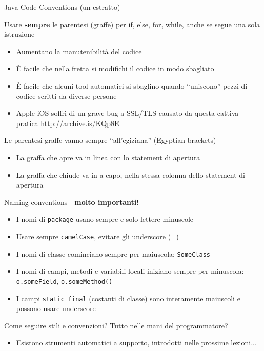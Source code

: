\documentclass[xcolor=dvipsnames,presentation]{beamer}
\begin{document}
\begin{frame}[allowframebreaks]{Java Code Conventions (un estratto)}
    \begin{block}{Usare \textbf{sempre} le parentesi (graffe) per if, else, for, while, anche se segue una sola istruzione}
        \begin{itemize}
            \item Aumentano la manutenibilità del codice
            \item È facile che nella fretta si modifichi il codice in modo sbagliato
            \item È facile che alcuni tool automatici si sbaglino quando ``uniscono'' pezzi di codice scritti da diverse persone
            \item Apple iOS soffrì di un grave bug a SSL/TLS causato da questa cattiva pratica \url{http://archive.is/KQp8E}
        \end{itemize}
    \end{block}
    \begin{block}{Le parentesi graffe vanno sempre ``all'egiziana'' (Egyptian brackets)}
        \begin{itemize}
            \item La graffa che apre va in linea con lo statement di apertura
            \item La graffa che chiude va in a capo, nella stessa colonna dello statement di apertura
        \end{itemize}
    \end{block}
    \begin{block}{Naming conventions - \textbf{molto importanti!}}
        \begin{itemize}
            \item I nomi di \texttt{package} usano sempre e solo lettere minuscole
            \item Usare sempre \texttt{camelCase}, evitare gli underscore (\_)
            \item I nomi di classe cominciano sempre per maiuscola: \texttt{SomeClass}
            \item I nomi di campi, metodi e variabili locali iniziano sempre per minuscola: \texttt{o.someField}, \texttt{o.someMethod()}
            \item I campi \texttt{static final} (costanti di classe) sono interamente maiuscoli e possono usare underscore
        \end{itemize}
    \end{block}

Come seguire stili e convenzioni? Tutto nelle mani del programmatore?
\begin{itemize}
\item Esistono strumenti automatici a supporto, introdotti nelle prossime lezioni...
    \end{itemize}
\end{frame}
\end{document}
